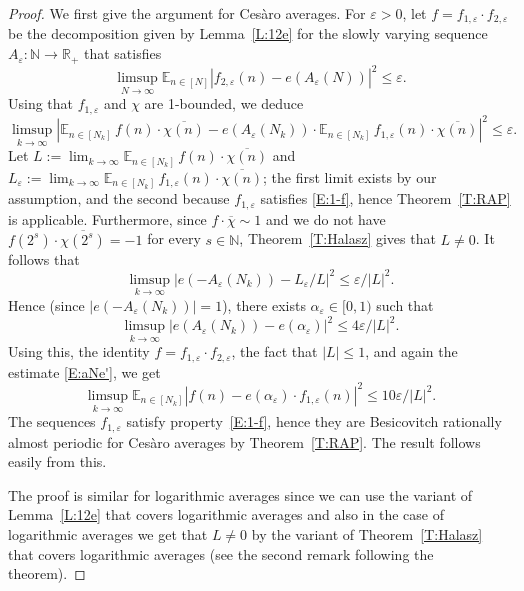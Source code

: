 \documentclass[11pt]{amsart}
\theoremstyle{definition}
\newcommand{\E}{{\mathbb E}}
\newcommand{\N}{{\mathbb N}}
\newcommand{\R}{{\mathbb R}}
\begin{document}
\begin{proof}
	We first give the argument for Ces\`aro averages.
	For $\varepsilon>0$, let $f=f_{1,\varepsilon}\cdot f_{2,\varepsilon}$ be the decomposition given by Lemma~\ref{L:12e} for the  slowly varying sequence $A_\varepsilon\colon \N\to \R_+$ that satisfies
	\begin{equation}\label{E:aNe'}
		\limsup_{N\to\infty}\E_{n\in [N]}|f_{2,\varepsilon}(n)-e(A_\varepsilon(N))|^2\leq \varepsilon.
	\end{equation}
	Using that 	$f_{1,\varepsilon}$ and $\chi$ are 1-bounded, we deduce
	$$
	\limsup_{k\to\infty} |\E_{n\in [N_k]}\, f(n)\cdot \overline{\chi(n)} -e(A_\varepsilon(N_k))\cdot \E_{n\in[N_k]}\, f_{1,\varepsilon}(n)\cdot\overline{\chi(n)}|^2\leq \varepsilon.
	$$
	Let $L:=\lim_{k\to\infty}\E_{n\in [N_k]}\, f(n)\cdot \overline{\chi(n)}$ and $L_\varepsilon:=\lim_{k\to\infty}\E_{n\in [N_k]}\, f_{1,\varepsilon}(n)\cdot \overline{\chi(n)}$; the first limit exists by our assumption, and the second because $f_{1,\varepsilon} $ satisfies \eqref{E:1-f}, hence Theorem~\ref{T:RAP} is applicable. Furthermore, since $f\cdot \overline{\chi}\sim 1$  and we do not have $f(2^s)\cdot \overline{\chi(2^s)}=-1$ for every $s\in \N$, Theorem~\ref{T:Halasz} gives that $L\neq 0$. It follows  that
	$$
	\limsup_{k\to\infty}|e(-A_\varepsilon(N_k))-L_\varepsilon/L|^2\leq \varepsilon/|L|^2.
	$$
	Hence (since $|e(-A_\varepsilon(N_k))|=1$), there exists $\alpha_\varepsilon\in [0,1)$ such that
	$$
	\limsup_{k\to\infty}|e(A_\varepsilon(N_k))-e(\alpha_\varepsilon)|^2\leq 4 \varepsilon/|L|^2.
	$$
	Using this, the identity  $f=f_{1,\varepsilon}\cdot f_{2,\varepsilon}$, the fact that $|L|\leq1$, and again the estimate \eqref{E:aNe'}, we get
	$$
	\limsup_{k\to\infty}\E_{n\in [N_k]}|f(n)-e(\alpha_\varepsilon) \cdot f_{1,\varepsilon}(n)|^2\leq 10 \varepsilon/|L|^2.
	$$
	 The sequences $f_{1,\varepsilon}$  satisfy property~\eqref{E:1-f}, hence they are Besicovitch rationally almost periodic for Ces\`aro averages by Theorem~\ref{T:RAP}.  The result follows easily from this.
	
	The proof is similar for logarithmic averages  since we can use the variant of Lemma~\ref{L:12e} that covers  logarithmic averages  and also  in the case of logarithmic averages we get that $L\neq 0$ by the variant of Theorem~\ref{T:Halasz} that covers logarithmic averages (see the second remark following the theorem).
\end{proof}
\end{document}
